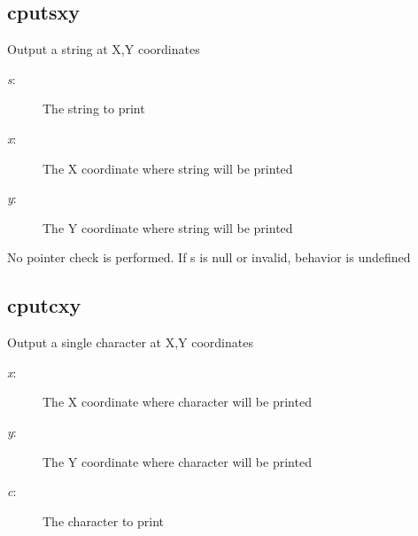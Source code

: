 \subsection{cputsxy}
\begin{description}[leftmargin=2cm,style=nextline]
\item [Description:] {Output a string at X,Y coordinates}
\item [Syntax:] 
\item [Parameters:]
\begin{description}\item[]
\item [{\em s}:] {The string to print}
\item [{\em x}:] {The X coordinate where string will be printed}
\item [{\em y}:] {The Y coordinate where string will be printed}
\end{description}
\item [Notes:] {No pointer check is performed.  If s is null or invalid, behavior is undefined }
\end{description}

\subsection{cputcxy}
\begin{description}[leftmargin=2cm,style=nextline]
\item [Description:] {Output a single character at X,Y coordinates}
\item [Syntax:] 
\item [Parameters:]
\begin{description}\item[]
\item [{\em x}:] {The X coordinate where character will be printed}
\item [{\em y}:] {The Y coordinate where character will be printed}
\item [{\em c}:] {The character to print}
\end{description}
\end{description}

